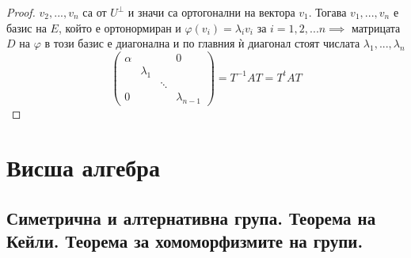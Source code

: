 \documentclass{article}
\begin{document}
\begin{proof}
$v_2, ..., v_n$ са от $U^{\perp}$ и значи са ортогонални на вектора $v_1$. \newline Тогава $v_1, ..., v_n$ е базис на $E$, който
е ортонормиран и $\varphi(v_i) = \lambda_iv_i$ за $i = 1, 2, ... n \implies$ матрицата $D$ на $\varphi$ в този базис е диагонална
и по главния ѝ диагонал стоят числата $\lambda_1, ..., \lambda_n$
$$\begin{pmatrix} \alpha & & & 0 \\ & \lambda_1 \\ & & \ddots & \\ 0 & & & \lambda_{n-1} \end{pmatrix}
= T^{-1}AT = T^tAT$$
\end{proof}

\section*{Висша алгебра}

\subsection*{Симетрична и алтернативна група. Теорема на Кейли. Теорема за хомоморфизмите на групи.}
\end{document}
